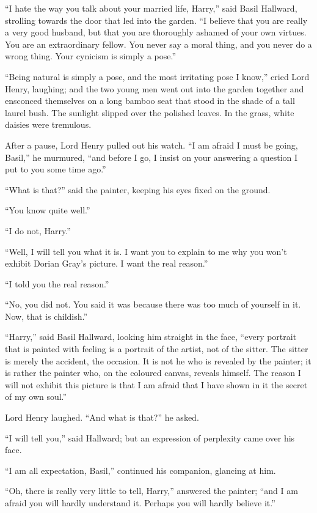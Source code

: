 “I hate the way you talk about your married life, Harry,” said Basil Hallward, strolling towards the door that led into the garden. “I believe that you are really a very good husband, but that you are thoroughly ashamed of your own virtues. You are an extraordinary fellow. You never say a moral thing, and you never do a wrong thing. Your cynicism is simply a pose.”

“Being natural is simply a pose, and the most irritating pose I know,” cried Lord Henry, laughing; and the two young men went out into the garden together and ensconced themselves on a long bamboo seat that stood in the shade of a tall laurel bush. The sunlight slipped over the polished leaves. In the grass, white daisies were tremulous.

After a pause, Lord Henry pulled out his watch. “I am afraid I must be going, Basil,” he murmured, “and before I go, I insist on your answering a question I put to you some time ago.”

“What is that?” said the painter, keeping his eyes fixed on the ground.

“You know quite well.”

“I do not, Harry.”

“Well, I will tell you what it is. I want you to explain to me why you won’t exhibit Dorian Gray’s picture. I want the real reason.”

“I told you the real reason.”

“No, you did not. You said it was because there was too much of yourself in it. Now, that is childish.”

“Harry,” said Basil Hallward, looking him straight in the face, “every portrait that is painted with feeling is a portrait of the artist, not of the sitter. The sitter is merely the accident, the occasion. It is not he who is revealed by the painter; it is rather the painter who, on the coloured canvas, reveals himself. The reason I will not exhibit this picture is that I am afraid that I have shown in it the secret of my own soul.”

Lord Henry laughed. “And what is that?” he asked.

“I will tell you,” said Hallward; but an expression of perplexity came over his face.

“I am all expectation, Basil,” continued his companion, glancing at him.

“Oh, there is really very little to tell, Harry,” answered the painter; “and I am afraid you will hardly understand it. Perhaps you will hardly believe it.”

